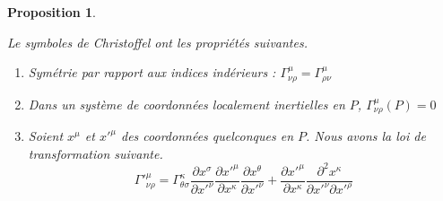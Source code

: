 \documentclass[a4paper,11pt]{report}
\theoremstyle{definition}
\theoremstyle{plain}
\newtheorem{prop}[thm]{Proposition}
\theoremstyle{definition}
\theoremstyle{remark}
\newcommand{\p}{\partial}
\begin{document}
            \begin{prop}\begin{leftbar}\label{prop:propgamma}
                Le symboles de Christoffel ont les propriétés suivantes.
                \begin{enumerate}[label = \textit{\roman*)}]
                    \item Symétrie par rapport aux indices indérieurs : $\Gamma^\mu_{\nu\rho}=\Gamma^\mu_{\rho\nu}$
                    \item Dans un système de coordonnées localement inertielles en $P$, $\Gamma^\mu_{\nu\rho}(P) = 0$
                    \item Soient $x^\mu$ et $x'^\mu$ des coordonnées quelconques en $P$. Nous avons la loi de transformation suivante.
                    \begin{equation}
                        \Gamma'^\mu_{\nu\rho} = \Gamma^\kappa_{\theta\sigma}\frac{\p x^\sigma}{\p x'^\nu} \frac{\p x'^\mu}{\p x^\kappa}\frac{\p x^\theta}{\p x'^\nu} +  \frac{\p x'^\mu}{\p x^\kappa}\frac{\p^2 x^\kappa}{\p x'^\nu\p x'^\rho}
                    \end{equation}
                \end{enumerate}
            \end{leftbar}\end{prop}
            
\end{document}
